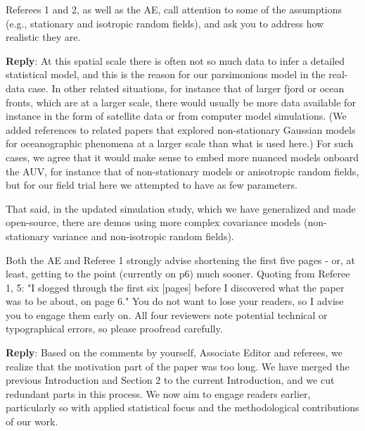 \documentclass[a4paper]{article}
\newcounter{reviewer}
\def\reply{\textbf{Reply}}
\begin{document}
\vspace{5mm}

Referees 1 and 2, as well as the AE, call attention to some of
the assumptions (e.g., stationary and isotropic random fields),
and ask you to address how realistic they are.

\reply: At this spatial scale there is often not so much data to infer a detailed statistical model, and this is the reason for our parsimonious model in the real-data case. In other related situations, for instance that of larger fjord or ocean fronts, which are at a larger scale, there would usually be more data available for instance in the form of satellite data or from computer model simulations. (We added references to related papers that explored non-stationary Gaussian models for oceanographic phenomena at a larger scale than what is used here.) For such cases, we agree that it would make sense to embed more nuanced models onboard the AUV, for instance that of non-stationary models or anisotropic random fields, but for our field trial here we attempted to have as few parameters. 

That said, in the updated simulation study, which we have generalized and made open-source, there are demos using more complex covariance models (non-stationary variance and non-isotropic random fields). 


\vspace{5mm}

Both the AE and Referee 1 strongly advise shortening the first
five pages - or, at least, getting to the point (currently on p6)
much sooner.  Quoting from  Referee 1, 5: "I slogged through the 
first six [pages] before I discovered what the paper was to be 
about, on page 6."  You do not want to lose your readers, so I
advise you to engage them early on.  All four reviewers note
potential technical or typographical errors, so please proofread
carefully.

\reply: Based on the comments by yourself, Associate Editor and referees, we realize that the motivation part of the paper was too long. We have merged the previous Introduction and Section 2 to the current Introduction, and we cut redundant parts in this process. We now aim to engage readers earlier, particularly so with applied statistical focus and the methodological contributions of our work. 
\end{document}
